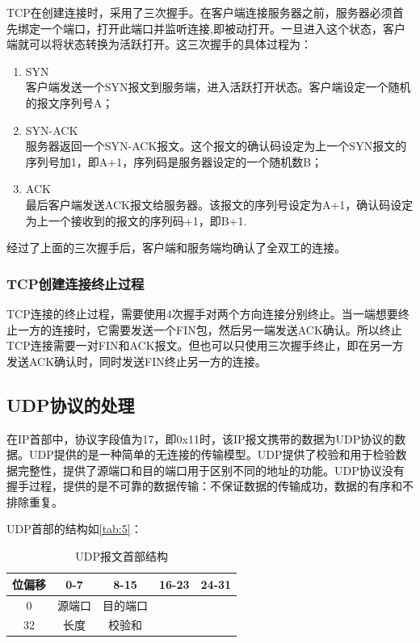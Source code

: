 \documentclass[format=final, language=chinese, degree=fyp]{hustthesis}
\begin{document}
TCP在创建连接时，采用了三次握手。在客户端连接服务器之前，服务器必须首先绑定一个端口，打开此端口并监听连接,即被动打开。一旦进入这个状态，客户端就可以将状态转换为活跃打开。这三次握手的具体过程为：

\begin{enumerate}
	\item SYN \\ 客户端发送一个SYN报文到服务端，进入活跃打开状态。客户端设定一个随机的报文序列号A；
	\item SYN-ACK \\ 服务器返回一个SYN-ACK报文。这个报文的确认码设定为上一个SYN报文的序列号加1，即A+1，序列码是服务器设定的一个随机数B；
	\item ACK \\ 最后客户端发送ACK报文给服务器。该报文的序列号设定为A+1，确认码设定为上一个接收到的报文的序列码+1，即B+1.
\end{enumerate}

经过了上面的三次握手后，客户端和服务端均确认了全双工的连接。


\subsubsection{TCP创建连接终止过程}

TCP连接的终止过程，需要使用4次握手对两个方向连接分别终止。当一端想要终止一方的连接时，它需要发送一个FIN包，然后另一端发送ACK确认。所以终止TCP连接需要一对FIN和ACK报文。但也可以只使用三次握手终止，即在另一方发送ACK确认时，同时发送FIN终止另一方的连接。

\subsection{UDP协议的处理}
在IP首部中，协议字段值为17，即0x11时，该IP报文携带的数据为UDP协议的数据。UDP提供的是一种简单的无连接的传输模型。UDP提供了校验和用于检验数据完整性，提供了源端口和目的端口用于区别不同的地址的功能。UDP协议没有握手过程，提供的是不可靠的数据传输：不保证数据的传输成功，数据的有序和不排除重复。

    
UDP首部的结构如\autoref{tab:5}：

\begin{table}[h!]
\centering
\caption{UDP报文首部结构}\label{tab:5}
\begin{tabular}{|c|c|c|c|c|}
	\hline
	位偏移 & 0-7 & 8-15 & 16-23 & 24-31\\\hline
	0 & 源端口 & 目的端口 \\\hline
	32 & 长度 & 校验和  \\\hline
	\end{tabular}
\end{table}
\end{document}
